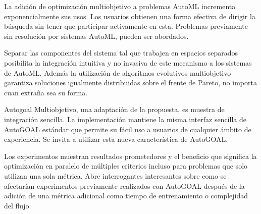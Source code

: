 \begin{conclusions}
    La adici\'on de optimizaci\'on multiobjetivo a problemas AutoML incrementa exponencialmente sus usos. Los usuarios obtienen una forma efectiva de dirigir la b\'usqueda sin tener que participar activamente en esta. Problemas previamente sin resoluci\'on por sistemas AutoML, pueden ser abordados.

    Separar las componentes del sistema tal que trabajen en espacios separados posibilita la integraci\'on intuitiva y no invasiva de este mecanismo a los sistemas de AutoML. Adem\'as la utilizaci\'on de algoritmos evolutivos multiobjetivo garantiza soluciones igualmente distribuidas sobre el frente de Pareto, no importa cuan extra\~na sea su forma.

    Autogoal Multiobjetivo, una adaptaci\'on de la propuesta, es muestra de integraci\'on sencilla. La implementaci\'on mantiene  la misma interfaz sencilla de AutoGOAL est\'andar que permite su f\'acil uso a usuarios de cualquier \'ambito de experiencia. Se invita a utilizar esta nueva caracter\'istica de AutoGOAL.

    Los experimentos muestran resultados prometedores y el beneficio que significa la optimizaci\'on en paralelo de m\'ultiples criterios incluso para problemas que solo utilizan una sola m\'etrica.
    Abre interrogantes interesantes sobre como se afectar\'ian experimentos previamente realizados con AutoGOAL despu\'es de la adici\'on de una m\'etrica adicional como tiempo de entrenamiento o complejidad del flujo.





\end{conclusions}
